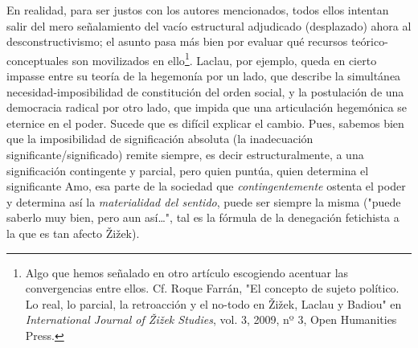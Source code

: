 \documentclass{book}
\begin{document}
En realidad, para ser justos con los autores mencionados, todos ellos
intentan salir del mero señalamiento del vacío estructural adjudicado
(desplazado) ahora al desconstructivismo; el asunto pasa más bien por
evaluar qué recursos teórico-conceptuales son movilizados en
ello\footnote{Algo que hemos señalado en otro artículo escogiendo
  acentuar las convergencias entre ellos. Cf. Roque Farrán, "El concepto
  de sujeto político. Lo real, lo parcial, la retroacción y el no-todo
  en Žižek, Laclau y Badiou" en \emph{International Journal of Žižek
  Studies}, vol. 3, 2009, nº 3, Open Humanities Press.}. Laclau, por
ejemplo, queda en cierto impasse entre su teoría de la hegemonía por un
lado, que describe la simultánea necesidad-imposibilidad de constitución
del orden social, y la postulación de una democracia radical por otro
lado, que impida que una articulación hegemónica se eternice en el
poder. Sucede que es difícil explicar el cambio. Pues, sabemos bien que
la imposibilidad de significación absoluta (la inadecuación
significante/significado) remite siempre, es decir estructuralmente, a
una significación contingente y parcial, pero quien puntúa, quien
determina el significante Amo, esa parte de la sociedad que
\emph{contingentemente} ostenta el poder y determina así la
\emph{materialidad del sentido}, puede ser siempre la misma ("puede
saberlo muy bien, pero aun así\ldots", tal es la fórmula de la
denegación fetichista a la que es tan afecto Žižek).
\end{document}
